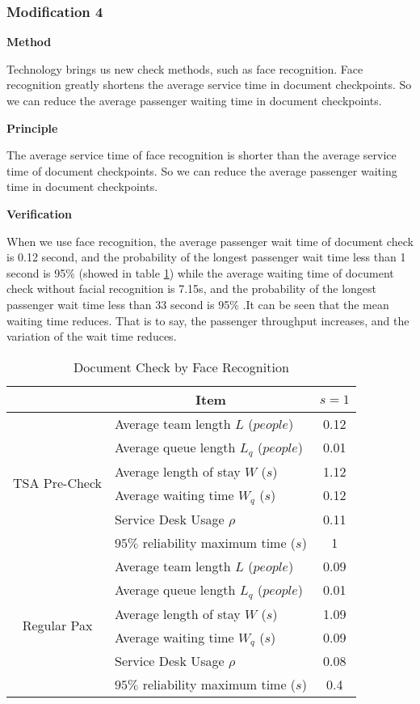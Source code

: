\documentclass{mcmthesis}
\begin{document}
\subsubsection*{Modification 4}
\par \textbf{Method}
\par Technology brings us new check methods, such as face recognition. Face recognition greatly shortens the average service time in document checkpoints. So we can reduce the average passenger waiting time in document checkpoints.
\par \textbf{Principle}
\par The average service time of face recognition is shorter than the average service time of document checkpoints. So we can reduce the average passenger waiting time in document checkpoints.
\par \textbf{Verification}
\par When we use face recognition, the average passenger wait time of document check is 0.12 second, and the probability of the longest passenger wait time less than 1 second is 95\% (showed in table \ref{Modification 4}) while the average waiting time of document check without facial recognition is 7.15s, and the probability of the longest passenger wait time less than 33 second is 95\% .It can be seen that the mean waiting time reduces. That is to say, the passenger throughput increases, and the variation of the wait time reduces.

\begin{table}[h]
\centering
\caption{Document Check by Face Recognition}
\label{Modification 4}
\begin{tabular}{c|l|c}
\toprule
 &\multicolumn{1}{c|}{Item}  & $s=1$  \\                      
\midrule
\multirow{6}{*}{TSA Pre-Check}
&Average team length $L$ ($people$)         & 0.12 \\
          
&Average queue length $L_q$ ($people$)      & 0.01 \\        
&Average length of stay $W$ ($s$)           & 1.12 \\   
&Average waiting time $W_q$ ($s$)           & 0.12 \\
&Service Desk Usage $\rho$                  & 0.11 \\ 
&$95\%$ reliability maximum time ($s$)      & 1 \\ 
\midrule
\multirow{6}{*}{Regular Pax}
&Average team length $L$ ($people$)         & 0.09 \\
          
&Average queue length $L_q$ ($people$)      & 0.01 \\        
&Average length of stay $W$ ($s$)           & 1.09 \\   
&Average waiting time $W_q$ ($s$)           & 0.09  \\
&Service Desk Usage $\rho$                  & 0.08 \\ 
&$95\%$ reliability maximum time ($s$)      & 0.4 \\        
\bottomrule        
\end{tabular}
\end{table}
\end{document}
